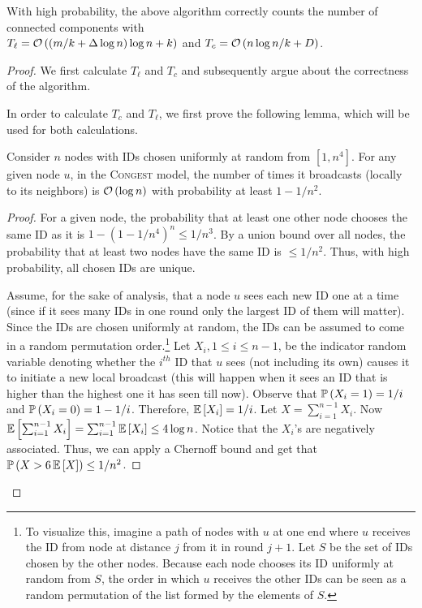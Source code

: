 \begin{theorem}
    \label{thm:flooding-thm}
With high probability, the above algorithm correctly counts the number of connected components with \\
$T_{\ell} = \mathcal{O}\left((m/k + \Delta\log n) \log n + k\right)$ and $T_c = \mathcal{O}\left(n\log n/k + D\right)$.
\end{theorem}

\begin{proof}
    We first calculate $T_{\ell}$ and $T_c$ and subsequently argue about the correctness of the algorithm.
    
    In order to calculate $T_c$ and $T_{\ell}$, we first prove the following lemma, which will be used for both calculations.
    
    \begin{lemma}
        \label{lem:num-higher-ids}
    Consider $n$ nodes with IDs chosen uniformly at random from $[1,n^4]$. For any given node $u$, in the \textsc{Congest} model, the number of times it  broadcasts (locally to its neighbors) is $\mathcal{O}\left(\log n\right)$ with probability at least $1 - 1/n^2$.
    \end{lemma}
    
    \begin{proof}
    For a given node, the probability that at least one other node chooses the same ID as it is $1 - (1- 1/n^4)^n \leq 1/n^3$. By a union bound over all nodes, the probability that at least two nodes have the same ID is $\leq 1/n^2$. Thus, with high probability, all chosen IDs are unique.
    
    Assume, for the sake of analysis,
    that a node $u$ sees each new ID one at a time (since
    if it sees many IDs in one round only the largest ID
    of them will matter). Since
    the IDs are chosen uniformly at random, the IDs can be assumed
    to come in a random permutation order.\footnote{To visualize this, imagine a path of nodes with $u$ at one end where $u$ receives the ID from node at distance $j$ from it in round $j+1$. Let $S$ be the set of IDs chosen by the other nodes. Because each node chooses its ID uniformly at random from $S$, the order in which $u$ receives the other IDs can be seen as a random permutation of the list formed by the elements of $S$.}
    Let $X_i, 1 \leq i \leq n-1$, be the indicator random variable denoting whether the $i^{th}$ ID that $u$ sees (not including its own) causes it to initiate a new local broadcast (this will happen when it sees an ID that
    is higher than the highest one it has seen till now).
    Observe that $\operatorname{\mathbb{P}}\left(X_i = 1\right) = 1/i$ and $\operatorname{\mathbb{P}}\left(X_i = 0\right) = 1 - 1/i$. Therefore, $\operatorname{\mathbb{E}}\left[X_i\right] = 1/i$. Let $X = \sum_{i=1}^{n-1} X_i$.
    Now $\operatorname{\mathbb{E}}\left[\sum_{i=1}^{n-1} X_i\right] = \sum_{i=1}^{n-1} \operatorname{\mathbb{E}}\left[X_i\right] \leq 4 \log n$. Notice that the $X_i$'s are negatively associated\cite{DubhashiP09}. Thus, we can apply a Chernoff bound\cite{DubhashiP09} and get that $\operatorname{\mathbb{P}}\left(X > 6\operatorname{\mathbb{E}}\left[X\right]\right) \leq 1/n^2$.
    

\end{proof}
\end{proof}
